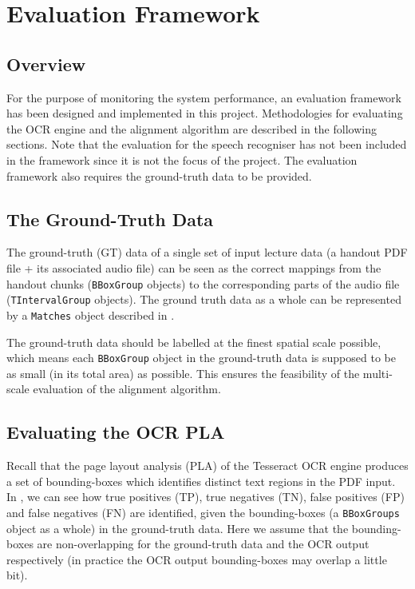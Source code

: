
\chapter{Evaluation Framework}
\label{chap:eval-framework}

\ifpdf
    \graphicspath{{Chapter7/Figs/Raster/}{Chapter7/Figs/PDF/}{Chapter7/Figs/}}
\else
    \graphicspath{{Chapter7/Figs/Vector/}{Chapter7/Figs/}}
\fi


\section{Overview}

For the purpose of monitoring the system performance, an evaluation framework has been designed and implemented in this project. Methodologies for evaluating the OCR engine and the alignment algorithm are described in the following sections. Note that the evaluation for the speech recogniser has not been included in the framework since it is not the focus of the project. The evaluation framework also requires the ground-truth data to be provided.

\section{The Ground-Truth Data}

The ground-truth (GT) data of a single set of input lecture data (a handout PDF file + its associated audio file) can be seen as the correct mappings from the handout chunks (\texttt{BBoxGroup} objects) to the corresponding parts of the audio file (\texttt{TIntervalGroup} objects). The ground truth data as a whole can be represented by a \texttt{Matches} object described in .

The ground-truth data should be labelled at the finest spatial scale possible, which means each \texttt{BBoxGroup} object in the ground-truth data is supposed to be as small (in its total area) as possible. This ensures the feasibility of the multi-scale evaluation of the alignment algorithm.

\section{Evaluating the OCR PLA}

Recall that the page layout analysis (PLA) of the Tesseract OCR engine produces a set of bounding-boxes which identifies distinct text regions in the PDF input. In , we can see how true positives (TP), true negatives (TN), false positives (FP) and false negatives (FN) are identified, given the bounding-boxes (a \texttt{BBoxGroups} object as a whole) in the ground-truth data. Here we assume that the bounding-boxes are non-overlapping for the ground-truth data and the OCR output respectively (in practice the OCR output bounding-boxes may overlap a little bit).


